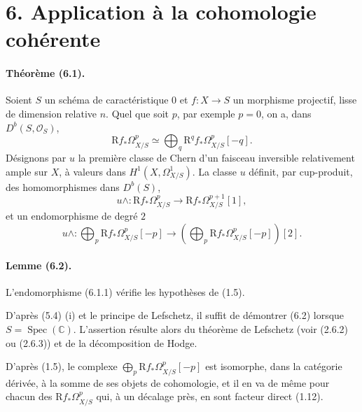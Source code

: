 \documentclass[10pt]{article}
\newcommand{\R}{\mathrm R}
\providecommand{\C}{\mathbb C}
\providecommand{\Spec}{\operatorname{Spec}}
\providecommand{\Ocal}{\mathcal O}
\begin{document}
\section*{6. Application à la cohomologie cohérente}

\paragraph{Théorème (6.1).} Soient $S$ un schéma de caractéristique $0$ et $f:X\to S$ un morphisme projectif, lisse de dimension relative $n$. Quel que soit $p$, par exemple $p=0$, on a, dans $D^b(S,\Ocal_S)$,
\[
\R f_*\Omega_{X/S}^p\simeq \bigoplus_q \R^qf_*\Omega_{X/S}^p[-q].
\]
Désignons par $u$ la première classe de Chern d'un faisceau inversible relativement ample sur $X$, à valeurs dans $H^1(X,\Omega_{X/S}^1)$. La classe $u$ définit, par cup-produit, des homomorphismes dans $D^b(S)$,
\[
u\wedge:\R f_*\Omega_{X/S}^p\longrightarrow \R f_*\Omega_{X/S}^{p+1}[1],
\]
et un endomorphisme de degré $2$
\[
\tag{6.1.1}
u\wedge:\bigoplus_p\R f_*\Omega_{X/S}^p[-p]
\longrightarrow
\left(\bigoplus_p\R f_*\Omega_{X/S}^p[-p]\right)[2].
\]

\paragraph{Lemme (6.2).} L'endomorphisme (6.1.1) vérifie les hypothèses de (1.5).

D'après (5.4) (i) et le principe de Lefschetz, il suffit de démontrer (6.2) lorsque $S=\Spec(\C)$. L'assertion résulte alors du théorème de Lefschetz (voir (2.6.2) ou (2.6.3)) et de la décomposition de Hodge.

D'après (1.5), le complexe $\bigoplus_p\R f_*\Omega_{X/S}^p[-p]$ est isomorphe, dans la catégorie dérivée, à la somme de ses objets de cohomologie, et il en va de même pour chacun des $\R f_*\Omega_{X/S}^p$ qui, à un décalage près, en sont facteur direct (1.12).
\end{document}
